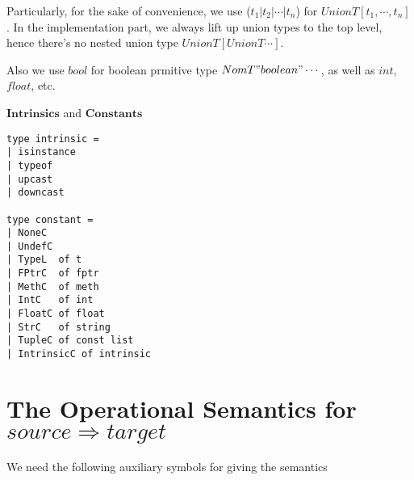 \documentclass[12pt, a4paper]{report}
\begin{document}
Particularly, for the sake of convenience, we use ($t_1 | t_2 | \cdots | t_n$) for
$\mathit{UnionT} \left[ t_1, \cdots, t_n\right]$. In the implementation part,
we always lift up union types to the top level, hence there's no nested union type $\mathit{UnionT} \left[UnionT \cdots \right]$.

Also we use $bool$ for boolean prmitive type $NomT "boolean" \cdots$,
as well as $int$, $float$, etc.

\newpage

$\mathbf{Intrinsics}$ and $\mathbf{Constants}$

\begin{lstlisting}
type intrinsic =
| isinstance
| typeof
| upcast
| downcast

type constant =
| NoneC
| UndefC
| TypeL  of t
| FPtrC  of fptr
| MethC  of meth
| IntC   of int
| FloatC of float
| StrC   of string
| TupleC of const list
| IntrinsicC of intrinsic
\end{lstlisting}

\section*{The Operational Semantics for $source \Rightarrow target$}

We need the following auxiliary symbols for giving the semantics
\end{document}
